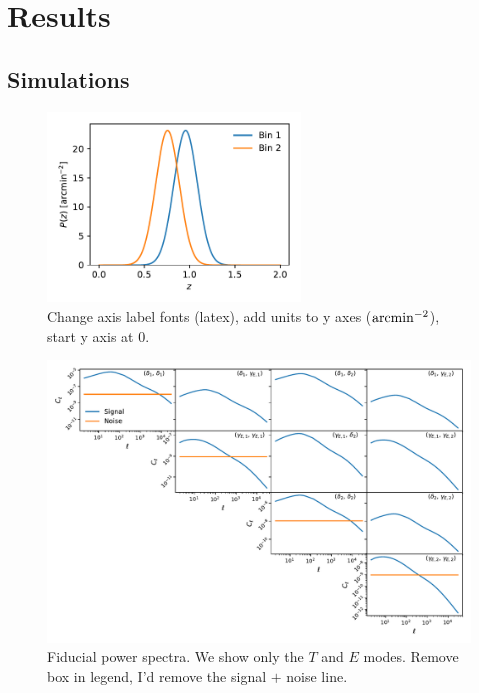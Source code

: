 \documentclass[a4paper,11pt]{article}
\newcommand{\red}[1]{{\color{red} #1}}
\begin{document}
  \section{Results}\label{sec:results}

    \subsection{Simulations}\label{ssec:results.sims}
      \begin{figure}
        \centering
        \includegraphics[width=0.6\textwidth]{./figures/pz.pdf}
        \caption{\red{Change axis label fonts (latex), add units to y axes (${\rm arcmin}^{-2}$), start y axis at 0.}}
        \label{fig:pz}
      \end{figure}

      \begin{figure}
        \centering
        \includegraphics[width=\textwidth]{./figures/cls-sph-2b.pdf}
        \caption{Fiducial power spectra. We show only the $T$ and $E$ modes. \red{Remove box in legend, I'd remove the signal $+$ noise line.}}
        \label{fig:cl-2bins}
      \end{figure}
      
\end{document}
